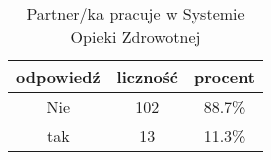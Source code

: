 \begin{table}[H]
\caption{Partner/ka pracuje w Systemie Opieki Zdrowotnej}
\centering
\begin{tabular}{ | c | c | c |}
\hline
odpowiedź & liczność & procent\\
\hline
Nie  &  102  & 88.7\% \\
\hline
tak  &  13  & 11.3\% \\
\hline
\end{tabular}
\label{tab:Q25}
\end{table}
